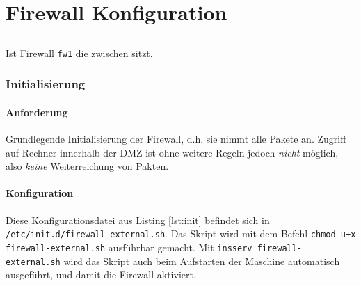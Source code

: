 \section{Firewall Konfiguration}

\subsection{\fwa}

Ist Firewall {\tt fw1} die zwischen \fwa sitzt.


\subsubsection{Initialisierung}

\paragraph{Anforderung} Grundlegende Initialisierung der Firewall, d.h.
sie nimmt alle Pakete an. Zugriff auf Rechner innerhalb der DMZ ist ohne
weitere Regeln jedoch \emph{nicht} möglich, also \emph{keine} Weiterreichung von
Pakten.

\paragraph{Konfiguration} Diese Konfigurationsdatei aus Listing \ref{lst:init}
befindet sich in {\tt /etc/init.d/firewall-external.sh}.
Das Skript wird mit dem Befehl {\tt chmod u+x firewall-external.sh}
ausführbar gemacht. Mit {\tt insserv firewall-external.sh}
wird das Skript auch beim Aufstarten der Maschine automatisch ausgeführt,
und damit die Firewall aktiviert.


